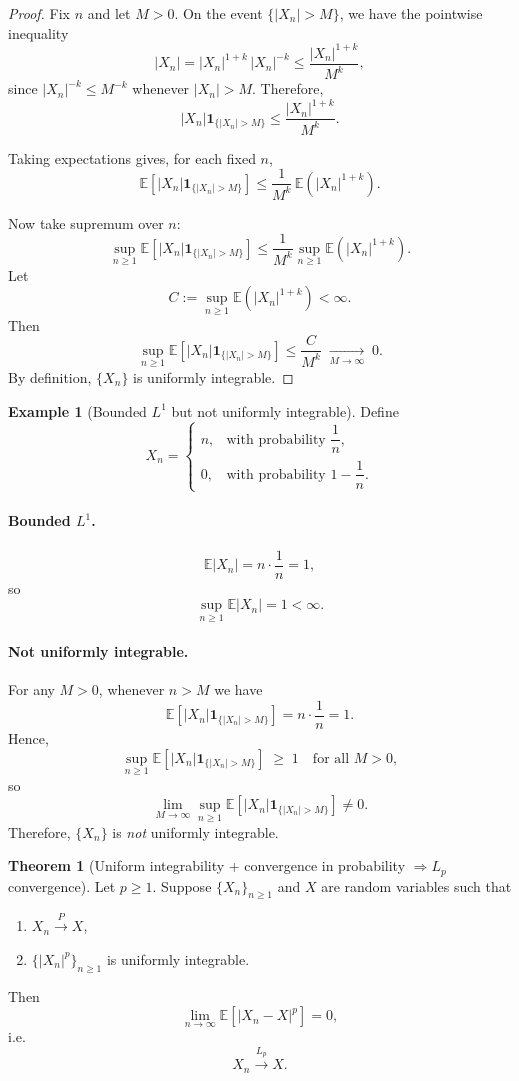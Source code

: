 \documentclass[11pt]{article}
\theoremstyle{definition}
\newtheorem{exmp}{Example}[section]
\newtheorem{theo}{Theorem}[section]
\begin{document}
\begin{proof}
Fix $n$ and let $M>0$.  
On the event $\{|X_n| > M\}$, we have the pointwise inequality
\[
|X_n|
=
|X_n|^{1+k} \, |X_n|^{-k}
\le
\frac{|X_n|^{1+k}}{M^k},
\]
since $|X_n|^{-k} \le M^{-k}$ whenever $|X_n| > M$.
Therefore,
\[
|X_n| \mathbf{1}_{\{|X_n| > M\}}
\le
\frac{|X_n|^{1+k}}{M^k}.
\]

Taking expectations gives, for each fixed $n$,
\[
\mathbb{E}\!\left[ |X_n| \mathbf{1}_{\{|X_n| > M\}} \right]
\le
\frac{1}{M^k} \, \mathbb{E}\!\left( |X_n|^{1+k} \right).
\]

Now take supremum over $n$:
\[
\sup_{n\ge 1}
\mathbb{E}\!\left[ |X_n| \mathbf{1}_{\{|X_n| > M\}} \right]
\le
\frac{1}{M^k}
\sup_{n\ge 1} \mathbb{E}\!\left( |X_n|^{1+k} \right).
\]
Let
\[
C := \sup_{n\ge 1} \mathbb{E}\!\left( |X_n|^{1+k} \right) < \infty.
\]
Then
\[
\sup_{n\ge 1}
\mathbb{E}\!\left[ |X_n| \mathbf{1}_{\{|X_n| > M\}} \right]
\le
\frac{C}{M^k}
\;\xrightarrow[M \to \infty]{}\; 0.
\]
By definition, $\{X_n\}$ is uniformly integrable.
\end{proof}

\begin{exmp}[Bounded $L^1$ but not uniformly integrable]
Define
\[
X_n =
\begin{cases}
n, & \text{with probability } \dfrac{1}{n},\\[6pt]
0, & \text{with probability } 1 - \dfrac{1}{n}.
\end{cases}
\]

\paragraph{Bounded $L^1$.}
\[
\mathbb{E}|X_n|
=
n \cdot \frac{1}{n}
=
1,
\]
so
\[
\sup_{n\ge 1} \mathbb{E}|X_n| = 1 < \infty.
\]

\paragraph{Not uniformly integrable.}
For any $M>0$, whenever $n > M$ we have
\[
\mathbb{E}\!\left[ |X_n| \mathbf{1}_{\{|X_n| > M\}} \right]
=
n \cdot \frac{1}{n}
=
1.
\]
Hence,
\[
\sup_{n\ge 1}
\mathbb{E}\!\left[ |X_n| \mathbf{1}_{\{|X_n| > M\}} \right]
\;\ge\; 1
\quad \text{for all } M>0,
\]
so
\[
\lim_{M\to\infty}
\sup_{n\ge 1}
\mathbb{E}\!\left[ |X_n| \mathbf{1}_{\{|X_n| > M\}} \right]
\neq 0.
\]
Therefore, $\{X_n\}$ is \emph{not} uniformly integrable.
\end{exmp}

\begin{theo}[Uniform integrability + convergence in probability $\Rightarrow L_p$ convergence]
Let $p \ge 1$. Suppose $\{X_n\}_{n\ge 1}$ and $X$ are random variables such that

\begin{enumerate}
\item $X_n \xrightarrow{P} X$,
\item $\{|X_n|^p\}_{n\ge 1}$ is uniformly integrable.
\end{enumerate}

Then
\[
\lim_{n\to\infty} \mathbb{E}\!\left[ |X_n - X|^p \right] = 0,
\]
i.e.
\[
X_n \xrightarrow{L_p} X.
\]
\end{theo}
\end{document}
